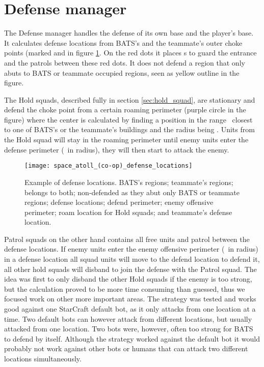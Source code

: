 \section{Defense manager}
\label{sec:defense_manager}
The Defense manager handles the defense of its own base and the player’s base. It calculates defense
locations from BATS's and the teammate's outer choke points (marked \usebox{\LegendDotRed} and
\usebox{\LegendDotOrange} in figure \ref{fig:defense_locations}. On the red dots it places
s to guard the entrance and the  patrols between
these red dots. It does not defend a region that only abuts to BATS or teammate
occupied regions, seen as yellow outline in the figure.

The Hold squads, described fully in section \ref{sec:hold_squad}, are stationary and defend the
choke point from a certain roaming perimeter (purple circle in the figure) where the center is
calculated by finding a position in the range \squadDefendRoamDistanceMinMax~closest to one of
BATS’s or the teammate’s buildings and the radius being \squadDefendRoamPerimeter. Units from the
Hold squad will stay in the roaming perimeter until enemy units enter the defense perimeter
(\squadDefendDefendPerimeter~in radius), they will then start to attack the enemy. 

\begin{figure}[htb]
\centering
\texttt{[image: space\_atoll\_(co-op)\_defense\_locations]}
\caption[Defense locations example]{
	Example of defense locations.
	\usebox{\LegendLineLightGreen} BATS’s regions;
	\usebox{\LegendLineLightBlue} teammate’s regions;
	\usebox{\LegendLineLightGreenLightBlue} belongs to both;
	\usebox{\LegendLineYellow} non-defended as they abut only BATS or teammate regions;
	\usebox{\LegendDotRed} defense locations;
	\usebox{\LegendCircleRed} defend perimeter;
	\usebox{\LegendCircleBrown} enemy offensive perimeter;
	\usebox{\LegendCircleViolet} roam location for Hold squads; and
	\usebox{\LegendDotOrange} teammate's defense location.}
\label{fig:defense_locations}
\end{figure}

Patrol squads on the other hand contains all free units and patrol between the defense locations. If
enemy units enter the enemy offensive perimeter (\squadDefendEnemyOffensivePerimeter~in radius) in a
defense location all squad units will move to the defend location to defend it, all other hold
squads will disband to join the defense with the Patrol squad. The idea was first to only disband
the other Hold squads if the enemy is too strong, but the calculation proved to be more time
consuming than guessed, thus we focused work on other more important areas. The strategy was tested
and works good against one StarCraft default bot, as it only attacks from one location at a time.
Two default bots can however attack from different locations, but usually attacked from one
location. Two bots were, however, often too strong for BATS to defend by itself. Although the
strategy worked against the default bot it would probably not work against other bots or humans that
can attack two different locations simultaneously.

